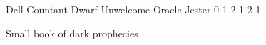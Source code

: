 
\filledCS%
  {Dell Countant}%
  {Dwarf}%
  {Unwelcome Oracle}%
  {Jester}%
  {{0}{-1}{-2}}%
  {{1}{-2}{-1}}%
  {%
    \renewcommand\characterDebt{100 \glspl{sp}}
    \renewcommand\rank{Fodder}
    \renewcommand\charSpells{
     \footnotesize
     \showSpells{Fate3}

      \showSpells{Fate2}

      \showSpells{Fate1}

      \showSpells{Fate1}
    }
    \setcounter{Academics}{1}
    \setcounter{Caving}{1}
    \setcounter{Performance}{1}
    \setcounter{Fate}{2}
    \shortsword
    \partialchain
    \addtocounter{equipmentWeight}{1}
  }%
  {\ritualcaster}%
  {Small book of dark prophecies}%


